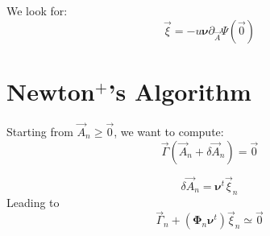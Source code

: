\documentclass[aps,onecolumn,11pt]{revtex4}
\begin{document}
 We look for:
 \begin{equation}
  	\vec{\xi} = -u \bm{\nu}\partial_{\vec{A}} \Psi (\vec{0})
 \end{equation}
 
\section{Newton$^+$'s Algorithm}

Starting from $\vec{A}_n\geq\vec{0}$, we want to compute:
\begin{equation}
	\vec{\Gamma}(\vec{A}_n+\delta\vec{A}_n) = \vec{0}
\end{equation}
	
\begin{equation}
	\delta\vec{A}_n = \bm{\nu}^t \vec{\xi}_n
\end{equation}
Leading to
\begin{equation}
	\vec{\Gamma}_n + (\bm{\Phi}_n \bm{\nu}^t ) \vec{\xi}_n \simeq \vec{0}
\end{equation}
 
\end{document}
